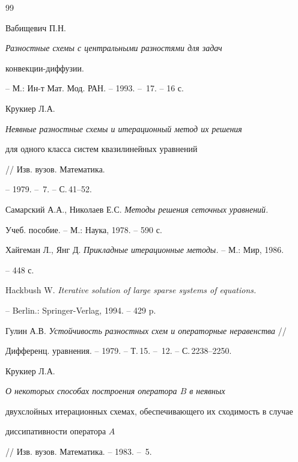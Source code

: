 \begin{thebibliography}{99}


Вабищевич П.Н. {\em Разностные схемы с центральными разностями для задач 


конвекции-диффузии.} -- М.: Ин-т Мат. Мод. РАН. -- 1993. -- \No\,17. -- 16 с. 







Крукиер Л.А. {\em Неявные разностные схемы и итерационный метод их решения 


для одного класса систем квазилинейных уравнений} // Изв. вузов. Математика. 


-- 1979. -- \No\,7. -- С.\,41--52. 







Самарский А.А., Николаев Е.С. {\em Методы решения сеточных уравнений.} 


Учеб. пособие. -- М.: Наука, 1978. -- 590 с. 







Хайгеман Л., Янг Д. {\em Прикладные итерационные методы.} -- М.: Мир, 1986. 


-- 448 с. 







Hackbush W. {\em Iterative solution of large sparse systems of equations.} 


-- Berlin.: Springer-Verlag, 1994. -- 429 p. 







Гулин А.В. {\em Устойчивость разностных схем и операторные неравенства} // 


Дифференц. уравнения. -- 1979. -- Т.\,15. -- \No\,12. -- С.\,2238--2250. 







Крукиер Л.А. {\em О некоторых способах построения оператора $B$ в неявных 


двухслойных итерационных схемах, обеспечивающего их сходимость в случае 


диссипативности оператора $A$} // Изв. вузов. Математика. -- 1983. -- \No\,5. 



\end{thebibliography}
